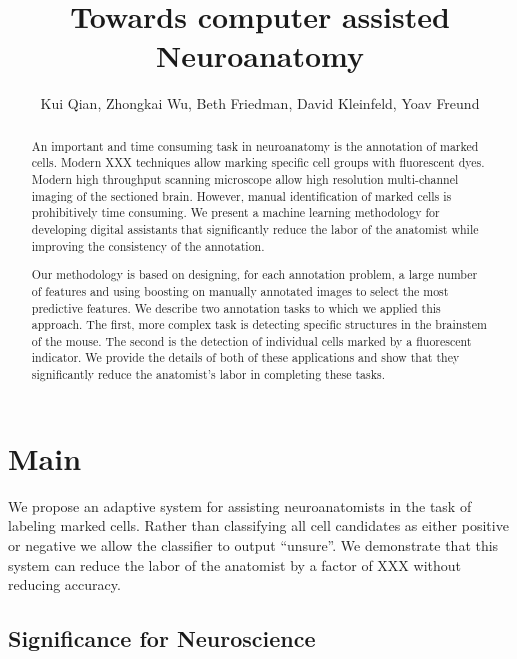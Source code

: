 \documentclass[11pt]{article}
\title{Towards computer assisted Neuroanatomy}
\author{Kui Qian, Zhongkai Wu, Beth Friedman, David Kleinfeld, Yoav Freund}
\begin{document}
\maketitle

\begin{abstract}
  An important and time consuming task in neuroanatomy is the
  annotation of marked cells. Modern XXX techniques allow marking
  specific cell groups with fluorescent dyes. Modern high throughput
  scanning microscope allow high resolution multi-channel imaging of
  the sectioned brain. However, manual identification of marked cells
  is prohibitively time consuming.  We present a machine
  learning methodology for developing digital assistants that
  significantly reduce the labor of the anatomist while improving the
  consistency of the annotation.

  Our methodology is based on designing, for each annotation problem,
  a large number of features and using boosting on manually annotated
  images to select the most predictive features. We describe two
  annotation tasks to which we applied this approach. The first, more
  complex task is detecting specific structures in the brainstem of
  the mouse. The second is the detection of individual cells marked by
  a fluorescent indicator. We provide the details of both of these
  applications and show that they significantly reduce the anatomist's
  labor in completing these tasks.
  
\end{abstract}

\section{Main}

We propose an adaptive system for assisting neuroanatomists in the
task of labeling marked cells. Rather than classifying all cell
candidates as either positive or negative we allow the classifier to
output ``unsure''. We demonstrate that this system can reduce the labor of the anatomist by a factor of XXX without reducing accuracy.


\subsection {Significance for Neuroscience}
\end{document}
